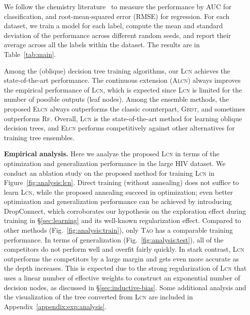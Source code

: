 \documentclass{article} \usepackage{iclr2020_conference,times}
\newcommand{\xref}[1]{\S\ref{#1}}
\begin{document}
We follow the chemistry literature~\citep{wu2018moleculenet} to measure the performance by AUC for classification, and root-mean-squared error (RMSE) for regression. For each dataset, we train a model for each label, compute the mean and standard deviation of the performance across  different random seeds, and report their average across all the labels within the dataset. The results are in Table~\ref{tab:main}. 

Among the (oblique) decision tree training algorithms, our \textsc{Lcn} achieves the state-of-the-art performance. The continuous extension (\textsc{Alcn}) always improves the empirical performance of \textsc{Lcn}, which is expected since \textsc{Lcn} is limited for the number of possible outputs (leaf nodes). Among the ensemble methods, the proposed \textsc{Elcn} always outperforms the classic counterpart, \textsc{Gbdt}, and sometimes outperforms \textsc{Rf}. Overall, \textsc{Lcn} is the state-of-the-art method for learning oblique decision trees, and \textsc{Elcn} performs competitively against other alternatives for training tree ensembles. 




\textbf{Empirical analysis.} Here we analyze the proposed \textsc{Lcn} in terms of the optimization and generalization performance in the large HIV dataset. We conduct an ablation study on the proposed method for training \textsc{Lcn} in Figure~\ref{fig:analysis:lcn}. Direct training (without annealing) does not suffice to learn \textsc{Lcn}, while the proposed annealing succeed in optimization; even better optimization and generalization performance can be achieved by introducing DropConnect, which corroborates our hypothesis on the exploration effect during training in \xref{sec:learning} and its well-known regularization effect. Compared to other methods (Fig.~\ref{fig:analysis:train}), only \textsc{Tao} has a comparable training performance. In terms of generalization (Fig.~\ref{fig:analysis:test}), all of the competitors do not perform well and overfit fairly quickly. In stark contrast, \textsc{Lcn} outperforms the competitors by a large margin and gets even more accurate as the depth increases. This is expected due to the strong regularization of \textsc{Lcn} that uses a linear number of effective weights to construct an exponential number of decision nodes, as discussed in \xref{sec:inductive-bias}. Some additional analysis and the visualization of the tree converted from \textsc{Lcn} are included in Appendix~\ref{appendix:exp:analysis}.\!\!\!\!\!
\end{document}
